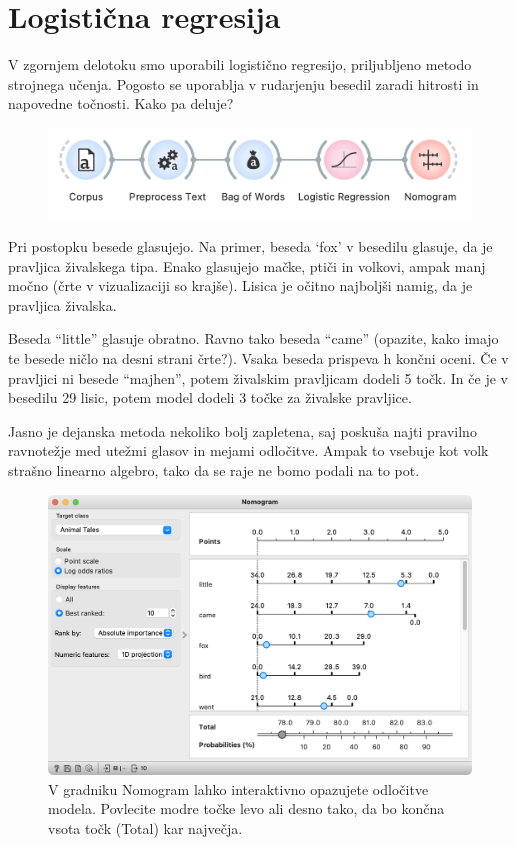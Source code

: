 \chapter{Logistična regresija}
\label{ch:logistic-regression}

V zgornjem delotoku smo uporabili logistično regresijo, priljubljeno metodo strojnega učenja. Pogosto se uporablja v rudarjenju besedil zaradi hitrosti in napovedne točnosti. Kako pa deluje?

\begin{figure}
    \includegraphics[width=\textwidth]{logisticna-workflow.png}
    \caption{ }
\end{figure}

Pri postopku besede glasujejo. Na primer, beseda ‘fox’ v besedilu glasuje, da je pravljica živalskega tipa. Enako glasujejo mačke, ptiči in volkovi, ampak manj močno (črte v vizualizaciji so krajše). Lisica je očitno najboljši namig, da je pravljica živalska.

Beseda ``little'' glasuje obratno. Ravno tako beseda ``came'' (opazite, kako imajo te besede ničlo na desni strani črte?). Vsaka beseda prispeva h končni oceni. Če v pravljici ni besede ``majhen'', potem živalskim pravljicam dodeli 5 točk. In če je v besedilu 29 lisic, potem model dodeli 3 točke za živalske pravljice. 

Jasno je dejanska metoda nekoliko bolj zapletena, saj poskuša najti pravilno ravnotežje med utežmi glasov in mejami odločitve. Ampak to vsebuje kot volk strašno linearno algebro, tako da se raje ne bomo podali na to pot.

\begin{figure}
    \includegraphics[width=\textwidth]{nomogram.png}
    \caption{V gradniku Nomogram lahko interaktivno opazujete odločitve modela. Povlecite modre točke levo ali desno tako, da bo končna vsota točk (Total) kar največja.}
\end{figure}
